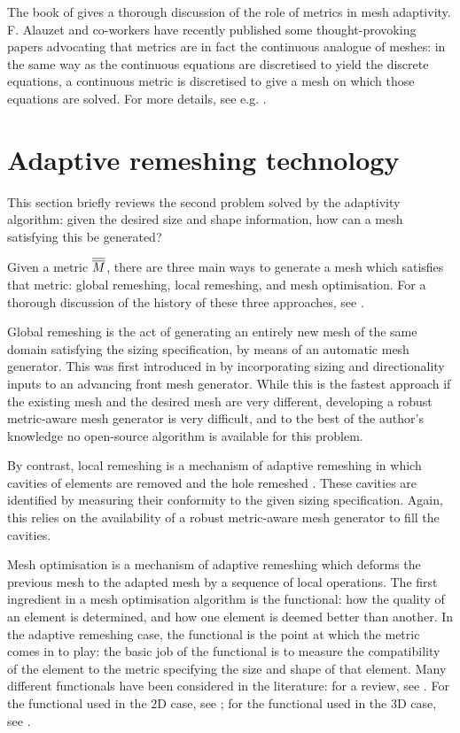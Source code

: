 The book of \citet{george1998} gives a thorough discussion of the role of metrics
in mesh adaptivity. F. Alauzet and co-workers have recently published some thought-provoking
papers advocating that metrics are in fact the continuous analogue of meshes: in the same
way as the continuous equations are discretised to yield the discrete equations, a continuous
metric is discretised to give a mesh on which those equations are solved. For more details, see
e.g. \citet{alauzet2006b,courty2006,alauzet2008,loseille2010i,loseille2010ii}.

\section{Adaptive remeshing technology} \label{sec:adaptive_remeshing_technology}
This section briefly reviews the second problem solved by the adaptivity algorithm: given the desired
size and shape information, how can a mesh satisfying this be generated?

Given a metric $\overline{\overline{M}}$, there are three main ways to generate a mesh which satisfies
that metric: global remeshing, local remeshing, and mesh optimisation. For a thorough discussion
of the history of these three approaches, see \citet{farrell2009i}.

Global remeshing is the act of generating an entirely new mesh of the same domain satisfying the sizing
specification, by means of an automatic mesh generator. This was first introduced in \citet{peraire1987} by incorporating
sizing and directionality inputs to an advancing front mesh generator. While this is the fastest
approach if the existing mesh and the desired mesh are very different, developing a robust metric-aware
mesh generator is very difficult, and to the best of the author's knowledge no open-source algorithm
is available for this problem. 

By contrast, local remeshing is a mechanism of adaptive remeshing in which cavities of elements are removed
and the hole remeshed \citep{hassan1998}. These cavities are identified by measuring
their conformity to the given sizing specification. Again, this relies on the availability of a robust
metric-aware mesh generator to fill the cavities.

Mesh optimisation is a mechanism of adaptive remeshing which deforms the previous mesh
to the adapted mesh by a sequence of local operations. The first ingredient in a mesh optimisation algorithm is the functional: how
the quality of an element is determined, and how one element is deemed better than
another. In the adaptive remeshing case, the functional is the point at which the metric
comes in to play: the basic job of the functional is to measure the compatibility of the
element to the metric specifying the size and shape of that element. Many different functionals
have been considered in the literature: for a review, see \citet{knupp2003}. For the
functional used in the 2D case, see \citet{vasilevskii1999}; for the functional used in the
3D case, see \citet{pain2001}.

